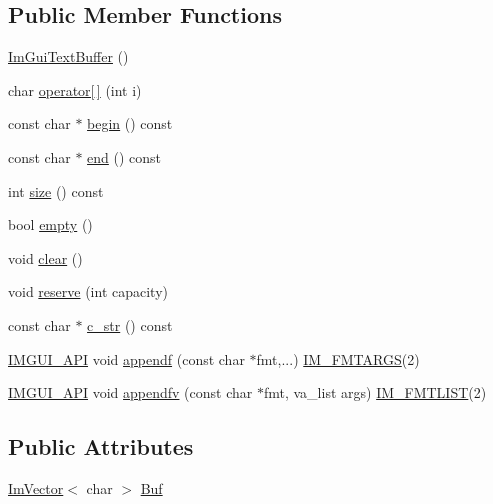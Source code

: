 \subsection*{Public Member Functions}
\begin{DoxyCompactItemize}
\item 
\mbox{\hyperlink{struct_im_gui_text_buffer_a4c4369c5e65f591554428b947c498d0d}{Im\+Gui\+Text\+Buffer}} ()
\item 
char \mbox{\hyperlink{struct_im_gui_text_buffer_a8550f53463fd12711e3d08b740227bd4}{operator\mbox{[}$\,$\mbox{]}}} (int i)
\item 
const char $\ast$ \mbox{\hyperlink{struct_im_gui_text_buffer_aab6d83c6b9a8061287a4cb6135c1cab4}{begin}} () const
\item 
const char $\ast$ \mbox{\hyperlink{struct_im_gui_text_buffer_a2fc30ad0d384f98dfcea722f798d91f2}{end}} () const
\item 
int \mbox{\hyperlink{struct_im_gui_text_buffer_a2811fcd43e0224eb3bd0f3464b634289}{size}} () const
\item 
bool \mbox{\hyperlink{struct_im_gui_text_buffer_afdef38ae725bb5495f0143170fa902c8}{empty}} ()
\item 
void \mbox{\hyperlink{struct_im_gui_text_buffer_a9e4edc9f950bc9e35d5c3b3071dbc0df}{clear}} ()
\item 
void \mbox{\hyperlink{struct_im_gui_text_buffer_a3271f361e0f1997f4c3eb77665fdf161}{reserve}} (int capacity)
\item 
const char $\ast$ \mbox{\hyperlink{struct_im_gui_text_buffer_afb03439bc91723e274bfb9d247a691b9}{c\+\_\+str}} () const
\item 
\mbox{\hyperlink{imgui_8h_a43829975e84e45d1149597467a14bbf5}{I\+M\+G\+U\+I\+\_\+\+A\+PI}} void \mbox{\hyperlink{struct_im_gui_text_buffer_a1c5892db030c5364823793f472754c9e}{appendf}} (const char $\ast$fmt,...) \mbox{\hyperlink{imgui_8h_a1251c2f9ddac0873dbad8181bd82c9f1}{I\+M\+\_\+\+F\+M\+T\+A\+R\+GS}}(2)
\item 
\mbox{\hyperlink{imgui_8h_a43829975e84e45d1149597467a14bbf5}{I\+M\+G\+U\+I\+\_\+\+A\+PI}} void \mbox{\hyperlink{struct_im_gui_text_buffer_ac8a6b11834c4cee8113bf6950e66112e}{appendfv}} (const char $\ast$fmt, va\+\_\+list args) \mbox{\hyperlink{imgui_8h_a047693beb7f899f5deab1e20202016b3}{I\+M\+\_\+\+F\+M\+T\+L\+I\+ST}}(2)
\end{DoxyCompactItemize}
\subsection*{Public Attributes}
\begin{DoxyCompactItemize}
\item 
\mbox{\hyperlink{class_im_vector}{Im\+Vector}}$<$ char $>$ \mbox{\hyperlink{struct_im_gui_text_buffer_aa6de034b1920cdae5505cc58abf14240}{Buf}}
\end{DoxyCompactItemize}
